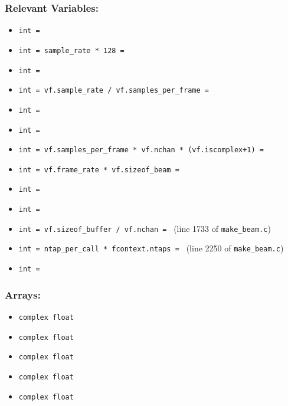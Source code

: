 \documentclass{article}
\begin{document}
\subsubsection*{Relevant Variables:}
\begin{itemize}
    \item \texttt{int  = }
    \item \texttt{int  = sample\_rate * 128 = }
    \item \texttt{int  = }
    \item \texttt{int  = vf.sample\_rate / vf.samples\_per\_frame = }
    \item \texttt{int  = }
    \item \texttt{int  = }
    \item \texttt{int  = vf.samples\_per\_frame * vf.nchan * (vf.iscomplex+1) = }
    \item \texttt{int  = vf.frame\_rate * vf.sizeof\_beam = }
    \item \texttt{int  = }
    \item \texttt{int  = }
    \item \texttt{int  = vf.sizeof\_buffer / vf.nchan = } (line 1733 of \texttt{make\_beam.c})
    \item \texttt{int  = ntap\_per\_call * fcontext.ntaps = } (line 2250 of \texttt{make\_beam.c})
    \item \texttt{int  = }
\end{itemize}

\subsubsection*{Arrays:}
\begin{itemize}
    \item \texttt{complex float }
    \item \texttt{complex float }
    \item \texttt{complex float }
    \item \texttt{complex float }
    \item \texttt{complex float }
\end{itemize}
\end{document}
